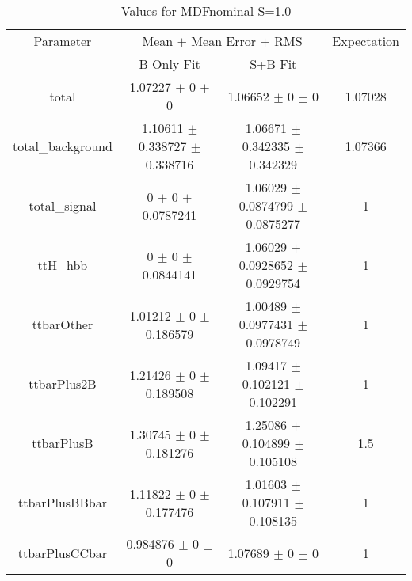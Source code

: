 \begin{table}
\centering
\caption{Values for MDFnominal S=1.0}
\begin{tabular}{cccc}
\toprule
Parameter & \multicolumn{2}{c}{Mean $\pm$ Mean Error $\pm$ RMS} & Expectation\\
 & B-Only Fit & S+B Fit & \\
\midrule
total & \num{1.07227} $\pm$ \num{0} $\pm$ \num{0} & \num{1.06652} $\pm$ \num{0} $\pm$ \num{0} & \num{1.07028}\\
total\_background & \num{1.10611} $\pm$ \num{0.338727} $\pm$ \num{0.338716} & \num{1.06671} $\pm$ \num{0.342335} $\pm$ \num{0.342329} & \num{1.07366}\\
total\_signal & \num{0} $\pm$ \num{0} $\pm$ \num{0.0787241} & \num{1.06029} $\pm$ \num{0.0874799} $\pm$ \num{0.0875277} & \num{1}\\
ttH\_hbb & \num{0} $\pm$ \num{0} $\pm$ \num{0.0844141} & \num{1.06029} $\pm$ \num{0.0928652} $\pm$ \num{0.0929754} & \num{1}\\
ttbarOther & \num{1.01212} $\pm$ \num{0} $\pm$ \num{0.186579} & \num{1.00489} $\pm$ \num{0.0977431} $\pm$ \num{0.0978749} & \num{1}\\
ttbarPlus2B & \num{1.21426} $\pm$ \num{0} $\pm$ \num{0.189508} & \num{1.09417} $\pm$ \num{0.102121} $\pm$ \num{0.102291} & \num{1}\\
ttbarPlusB & \num{1.30745} $\pm$ \num{0} $\pm$ \num{0.181276} & \num{1.25086} $\pm$ \num{0.104899} $\pm$ \num{0.105108} & \num{1.5}\\
ttbarPlusBBbar & \num{1.11822} $\pm$ \num{0} $\pm$ \num{0.177476} & \num{1.01603} $\pm$ \num{0.107911} $\pm$ \num{0.108135} & \num{1}\\
ttbarPlusCCbar & \num{0.984876} $\pm$ \num{0} $\pm$ \num{0} & \num{1.07689} $\pm$ \num{0} $\pm$ \num{0} & \num{1}\\
\bottomrule
\end{tabular}
\end{table}